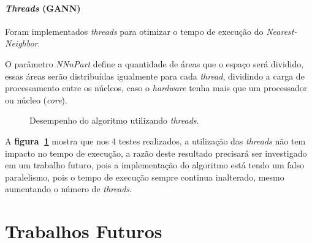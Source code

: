 \documentclass[12pt,openright,a4paper,oneside]{tcc}
\begin{document}
			\subsubsection{\textit{Threads} (GANN)}

			Foram implementados \textit{threads} para otimizar o tempo de execução do \textit{Nearest-Neighbor}. 

			O parâmetro \textit{NNnPart} define a quantidade de áreas que o espaço será dividido, essas áreas serão distribuídas igualmente para cada \textit{thread}, dividindo a carga de processamento entre os núcleos, caso o \textit{hardware} tenha mais que um processador ou núcleo (\textit{core}).

			\begin{figure}[h!]
				\centering
                \caption{Desempenho do algoritmo utilizando \textit{threads}.}
				\label{figthread}
			\end{figure}

			A \textbf{figura~\ref{figthread}} mostra que nos 4 testes realizados, a utilização das \textit{threads} não tem impacto no tempo de execução, a razão deste resultado precisará ser investigado em um trabalho futuro, pois a implementação do algoritmo está tendo um falso paralelismo, pois o tempo de execução sempre continua inalterado, mesmo aumentando o número de \textit{threads}.

			
	\chapter{Trabalhos Futuros}
\end{document}

